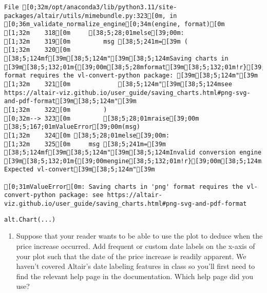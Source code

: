 \documentclass[
  letterpaper,
  DIV=11,
  numbers=noendperiod]{scrartcl}
\providecommand{\tightlist}{%
  \setlength{\itemsep}{0pt}\setlength{\parskip}{0pt}}\usepackage{longtable,booktabs,array}
\begin{document}
\begin{verbatim}
File [0;32m/opt/anaconda3/lib/python3.11/site-packages/altair/utils/mimebundle.py:323[0m, in [0;36m_validate_normalize_engine[0;34m(engine, format)[0m
[1;32m    318[0m     [38;5;28;01melse[39;00m:
[1;32m    319[0m         msg [38;5;241m=[39m (
[1;32m    320[0m             [38;5;124mf[39m[38;5;124m"[39m[38;5;124mSaving charts in [39m[38;5;132;01m{[39;00m[38;5;28mformat[39m[38;5;132;01m!r}[39;00m[38;5;124m format requires the vl-convert-python package: [39m[38;5;124m"[39m
[1;32m    321[0m             [38;5;124m"[39m[38;5;124msee https://altair-viz.github.io/user_guide/saving_charts.html#png-svg-and-pdf-format[39m[38;5;124m"[39m
[1;32m    322[0m         )
[0;32m--> 323[0m         [38;5;28;01mraise[39;00m [38;5;167;01mValueError[39;00m(msg)
[1;32m    324[0m [38;5;28;01melse[39;00m:
[1;32m    325[0m     msg [38;5;241m=[39m [38;5;124mf[39m[38;5;124m"[39m[38;5;124mInvalid conversion engine [39m[38;5;132;01m{[39;00mengine[38;5;132;01m!r}[39;00m[38;5;124m. Expected vl-convert[39m[38;5;124m"[39m

[0;31mValueError[0m: Saving charts in 'png' format requires the vl-convert-python package: see https://altair-viz.github.io/user_guide/saving_charts.html#png-svg-and-pdf-format
\end{verbatim}

\begin{verbatim}
alt.Chart(...)
\end{verbatim}

\begin{enumerate}
\def\labelenumi{\arabic{enumi}.}
\setcounter{enumi}{1}
\tightlist
\item
  Suppose that your reader wants to be able to use the plot to deduce
  when the price increase occurred. Add frequent or custom date labels
  on the x-axis of your plot such that the date of the price increase is
  readily apparent. We haven't covered Altair's date labeling features
  in class so you'll first need to find the relevant help page in the
  documentation. Which help page did you use?
\end{enumerate}
\end{document}
